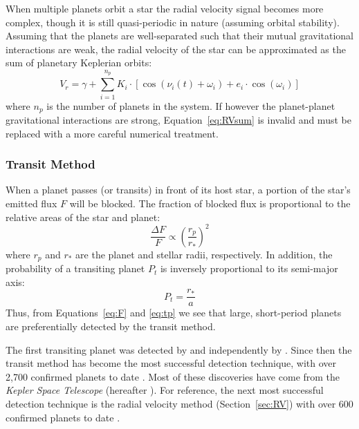 When multiple planets orbit a star the radial velocity signal becomes more complex, though it is still quasi-periodic in nature (assuming orbital stability). 
Assuming that the planets are well-separated such that their mutual gravitational interactions are weak, the radial velocity of the star can be approximated as the sum of planetary Keplerian orbits:
\begin{equation}
V_r = \gamma + \sum_{i=1}^{n_p} K_i \cdot [\cos(\nu_i(t) + \omega_i) + e_i\cdot \cos(\omega_i)]
\label{eq:RVsum}
\end{equation}
where $n_p$ is the number of planets in the system. 
If however the planet-planet gravitational interactions are strong, Equation~\ref{eq:RVsum} is invalid and must be replaced with a more careful numerical treatment. 

\subsubsection{Transit Method}
\label{sec:transit}
When a planet passes (or transits) in front of its host star, a portion of the star's emitted flux $F$ will be blocked. 
The fraction of blocked flux is proportional to the relative areas of the star and planet:
\begin{equation}
\frac{\Delta F}{F} \propto \left(\frac{r_p}{r_*}\right)^2
\label{eq:F}
\end{equation}
where $r_p$ and $r_*$ are the planet and stellar radii, respectively. 
In addition, the probability of a transiting planet $P_t$ is inversely proportional to its semi-major axis:
\begin{equation}
P_t = \frac{r_*}{a}
\label{eq:tp}
\end{equation}
Thus, from Equations~\ref{eq:F} and \ref{eq:tp} we see that large, short-period planets are preferentially detected by the transit method.

The first transiting planet was detected by \citet{Henry1999} and independently by \citet{Charbonneau2000}.
Since then the transit method has become the most successful detection technique, with over 2,700 confirmed planets to date \citep{NASAEA}. 
Most of these discoveries have come from the \textit{Kepler Space Telescope} (hereafter \kep).
For reference, the next most successful detection technique is the radial velocity method (Section~\ref{sec:RV}) with over 600 confirmed planets to date \citep{NASAEA}.


